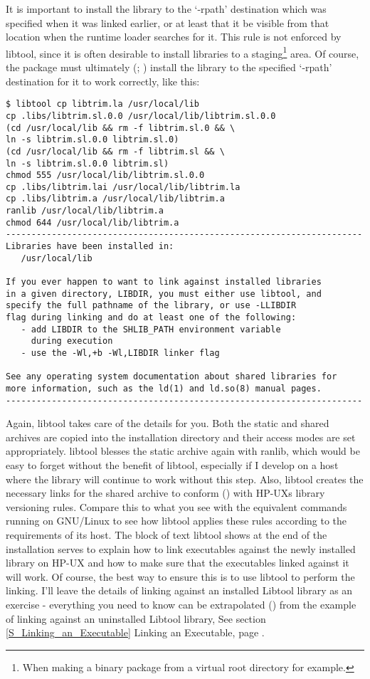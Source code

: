 It is important to install the library to the `-rpath' destination which was 
specified when it was linked earlier, or at least that it be visible from 
that location when the runtime loader searches for it. This rule is not 
enforced by libtool, since it is often desirable to install libraries to a 
staging\footnote{When making a binary package from a virtual root directory 
for example. } area. Of course, the package must ultimately ({\MbQ{}}; {\McQ{}})
install the library to the specified `-rpath' destination for it to work 
correctly, like this: 

\begin{Verbatim}
$ libtool cp libtrim.la /usr/local/lib
cp .libs/libtrim.sl.0.0 /usr/local/lib/libtrim.sl.0.0
(cd /usr/local/lib && rm -f libtrim.sl.0 && \
ln -s libtrim.sl.0.0 libtrim.sl.0)
(cd /usr/local/lib && rm -f libtrim.sl && \
ln -s libtrim.sl.0.0 libtrim.sl)
chmod 555 /usr/local/lib/libtrim.sl.0.0
cp .libs/libtrim.lai /usr/local/lib/libtrim.la
cp .libs/libtrim.a /usr/local/lib/libtrim.a
ranlib /usr/local/lib/libtrim.a
chmod 644 /usr/local/lib/libtrim.a
----------------------------------------------------------------------
Libraries have been installed in:
   /usr/local/lib

If you ever happen to want to link against installed libraries
in a given directory, LIBDIR, you must either use libtool, and
specify the full pathname of the library, or use -LLIBDIR
flag during linking and do at least one of the following:
   - add LIBDIR to the SHLIB_PATH environment variable
     during execution
   - use the -Wl,+b -Wl,LIBDIR linker flag

See any operating system documentation about shared libraries for
more information, such as the ld(1) and ld.so(8) manual pages.
----------------------------------------------------------------------
\end{Verbatim}

Again, libtool takes care of the details for you. Both the static and shared archives are copied into the installation directory and their access modes are set appropriately. libtool blesses the static archive again with ranlib, which would be easy to forget without the benefit of libtool, especially if I develop on a host where the library will continue to work without this step. Also, libtool creates the necessary links for the shared archive to conform ({\MjQ{}}) with HP-UXs library versioning rules. Compare this to what you see with the equivalent commands running on GNU/Linux to see how libtool applies these rules according to the requirements of its host. The block of text libtool shows at the end of the installation serves to explain how to link executables against the newly installed library on HP-UX and how to make sure that the executables linked against it will work. Of course, the best way to ensure this is to use libtool to perform the linking. I'll leave the details of linking against an installed Libtool library as an exercise - everything you need to know can be extrapolated ({\MbQ{}}) from the example of linking against an uninstalled Libtool library, See section \ref{S_Linking_an_Executable} Linking an Executable, page \pageref{S_Linking_an_Executable}. 


